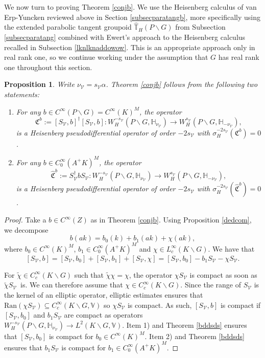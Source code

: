 \documentclass[a4paper,reqno]{amsart}
\numberwithin{equation}{section}
\def\T{\mathbb{T}}
\newtheorem{prop}[thm]{Proposition}
\theoremstyle{definition}
\theoremstyle{remark}
\begin{document}
We now turn to proving Theorem \ref{conjb}. We use the Heisenberg calculus of van Erp-Yuncken \cite{vanerpyunck} reviewed above in Section \ref{subsecparatangb}, more specifically using the extended parabolic tangent groupoid $\hat{\T}_H(P\backslash G)$ from Subsection \ref{subsecparatang} combined with Ewert's approach to the Heisenberg calculus recalled in Subsection \ref{lknlknaddowow}. This is an appropriate approach only in real rank one, so we continue working under the assumption that $G$ has real rank one throughout this section. 

\begin{prop}
\label{ajnfkajn}
Write $\nu_{\mathcal{V}}=s_{\mathcal{V}}\alpha$. Theorem \ref{conjb} follows from the following two statements:
\begin{enumerate}
\item For any $b\in C^\infty(P\backslash G)=C^\infty(K)^M$, the operator 
$$\mathfrak{C}^b:=[S_{\mathcal{V}},b]^\dagger[S_{\mathcal{V}},b]:W^{-s_\mathcal{V}}_{H}(P\backslash G, \mathbb{H}_{\nu_{\mathcal{V}}})\to W^{s_\mathcal{V}}_{H}(P\backslash G, \mathbb{H}_{-\nu_{\mathcal{V}}}),$$
is a Heisenberg pseudodifferential operator of order $-2s_\mathcal{V}$ with $\sigma_H^{-2s_\mathcal{V}}(\mathfrak{C}^b)=0$.
\item For any $b\in C^\infty_0(A^+K)^M$, the operator 
$$\hat{\mathfrak{C}}^b:=S_{\mathcal{V}}^\dagger b S_{\mathcal{V}}:W^{-s_\mathcal{V}}_{H}(P\backslash G, \mathbb{H}_{\nu_{\mathcal{V}}})\to W^{s_\mathcal{V}}_{H}(P\backslash G, \mathbb{H}_{-\nu_{\mathcal{V}}}),$$
is a Heisenberg pseudodifferential operator of order $-2s_\mathcal{V}$ with $\sigma_H^{-2s_\mathcal{V}}(\hat{\mathfrak{C}}^b)=0$.
\end{enumerate}
\end{prop}

\begin{proof}
Take a $b\in C^\infty(Z)$ as in Theorem \ref{conjb}. Using Proposition \ref{dedcom}, we decompose 
$$b(ak)=b_0(k)+b_1(ak)+\chi(ak),$$
where $b_0\in C^\infty(K)^M$, $b_1\in C^\infty_0(A^+K)^M$ and $\chi\in L^\infty_c(K\backslash G)$. We have that
$$[S_{\mathcal{V}},b]=[S_{\mathcal{V}},b_0]+[S_{\mathcal{V}},b_1]+[S_{\mathcal{V}},\chi]=[S_{\mathcal{V}},b_0]-b_1S_{\mathcal{V}}-\chi S_{\mathcal{V}}.$$


For $\tilde{\chi}\in C^\infty_c(K\backslash G)$ such that $\tilde{\chi}\chi=\chi$, the operator $\chi S_{\mathcal{V}}$ is compact as soon as $\tilde{\chi}S_{\mathcal{V}}$ is. We can therefore assume that $\chi\in C^\infty_c(K\backslash G)$. Since the range of $S_{\mathcal{V}}$ is the kernel of an elliptic operator, elliptic estimates ensures that $\mathrm{Ran}(\chi S_{\mathcal{V}})\subseteq C^\infty_c(K\backslash G,\mathbb{V})$ so $\chi S_{\mathcal{V}}$ is compact. As such, $[S_{\mathcal{V}},b]$ is compact if $[S_{\mathcal{V}},b_0]$ and $b_1S_{\mathcal{V}}$ are compact as operators $W^{-s_\mathcal{V}}_{H}(P\backslash G, \mathbb{H}_{\nu_{\mathcal{V}}})\to L^2(K \backslash G,\mathbb{V})$. Item 1) and  Theorem \ref{bddsds} ensures that $[S_{\mathcal{V}},b_0]$ is compact for $b_0\in C^\infty(K)^M$. Item 2) and Theorem \ref{bddsds} ensures that $b_1S_{\mathcal{V}}$ is compact for $b_1\in C^\infty_0(A^+K)^M$.
\end{proof}
\end{document}
